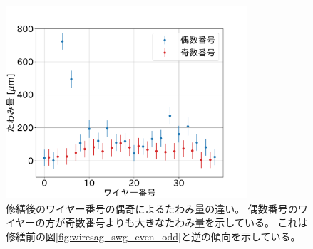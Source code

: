 \documentclass[../../main.tex]{subfiles}
\begin{document}
\begin{figure}[H]
    \centering
    \includegraphics[width=0.8\textwidth]{wiresag_swg/swg_sag_after_even_odd.pdf}
    \caption{修繕後のワイヤー番号の偶奇によるたわみ量の違い。
    偶数番号のワイヤーの方が奇数番号よりも大きなたわみ量を示している。
    これは修繕前の図\ref{fig:wiresag_swg_even_odd}と逆の傾向を示している。}
    \label{fig:wiresag_swg_even_odd_repair}
\end{figure}
\end{document}
